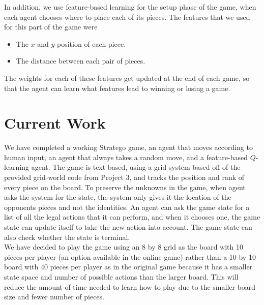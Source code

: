 \documentclass[letterpaper]{article}
\begin{document}
In addition, we use feature-based learning for the setup phase of the game, when each agent chooses where to place each of its pieces. The features that we used for this part of the game were
\begin{itemize}
\item The $x$ and $y$ position of each piece.
\item The distance between each pair of pieces.
\end{itemize}

The weights for each of these features get updated at the end of each game, so that the agent can learn what features lead
to winning or losing a game.


\section{Current Work}

We have completed a working Stratego game, an agent that moves according to human input, an agent that always takes a random move, and a feature-based $Q$-learning agent. The game is text-based, using a grid system based off of the provided grid-world code from Project 3, and tracks the position and rank of every piece on the board. To preserve the unknowns in the game, when agent asks the system for the state, the system only gives it the location of the opponents pieces and not the identities. An agent can ask the game state for a list of all the legal actions that it can perform, and when it chooses one, the game state can update itself to take the new action into account. The game state can also check whether the state is terminal.\\

We have decided to play the game using an 8 by 8 grid as the board with 10 pieces per player (an option available in the online game) rather than a 10 by 10 board with 40 pieces per player as in the original game because it has a smaller state space and number of possible actions than the larger board. This will reduce the amount of time needed to learn how to play  due to the smaller board size and fewer number of pieces.\\
\end{document}
